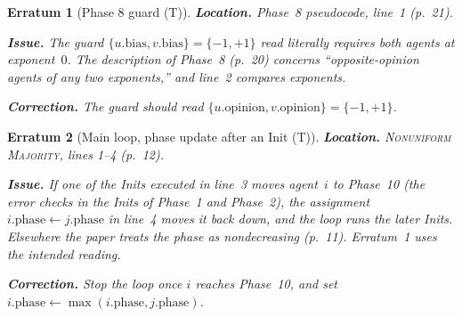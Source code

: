 \documentclass[11pt]{article}
\theoremstyle{erratumstyle}
\newtheorem{erratum}{Erratum}
\begin{document}
\begin{erratum}[Phase 8 guard (T)]
\textbf{Location.} Phase~8 pseudocode, line~1 (p.~21).

\medskip
\textbf{Issue.} The guard $\{u.\mathrm{bias},v.\mathrm{bias}\}=\{-1,+1\}$
read literally requires both agents at exponent~$0$. The description of
Phase~8 (p.~20) concerns ``opposite-opinion agents of any two exponents,''
and line~2 compares exponents.

\medskip
\textbf{Correction.} The guard should read
$\{u.\mathrm{opinion},v.\mathrm{opinion}\}=\{-1,+1\}$.
\end{erratum}

\begin{erratum}[Main loop, phase update after an Init (T)]
\textbf{Location.} \textsc{Nonuniform Majority}, lines 1--4 (p.~12).

\medskip
\textbf{Issue.} If one of the Inits executed in line~3 moves agent~$i$ to
Phase~10 (the error checks in the Inits of Phase~1 and Phase~2), the
assignment $i.\mathrm{phase}\leftarrow j.\mathrm{phase}$ in line~4 moves it
back down, and the loop runs the later Inits. Elsewhere the paper treats the
phase as nondecreasing (p.~11). Erratum~1 uses the intended reading.

\medskip
\textbf{Correction.} Stop the loop once $i$ reaches Phase~10, and set
$i.\mathrm{phase}\leftarrow\max(i.\mathrm{phase},j.\mathrm{phase})$.
\end{erratum}
\end{document}
